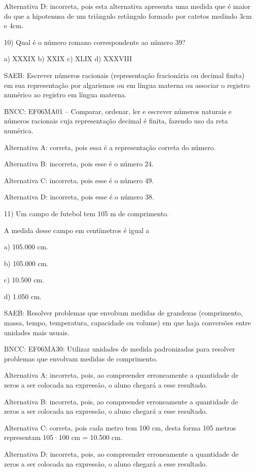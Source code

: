 Alternativa D: incorreta, pois esta alternativa apresenta uma medida que
é maior do que a hipotenusa de um triângulo retângulo formado por
catetos medindo 3cm e 4cm.

10) Qual é o número romano correspondente ao número 39?

a) XXXIX b) XXIX c) XLIX d) XXXVIII

SAEB: Escrever números racionais (representação fracionária ou decimal
finita) em sua representação por algarismos ou em língua materna ou
associar o registro numérico ao registro em língua materna.

BNCC: EF06MA01 -- Comparar, ordenar, ler e escrever números naturais e
números racionais cuja representação decimal é finita, fazendo uso da
reta numérica.

Alternativa A: correta, pois essa é a representação correta do número.

Alternativa B: incorreta, pois esse é o número 24.

Alternativa C: incorreta, pois esse é o número 49.

Alternativa D: incorreta, pois esse é o número 38.

11) Um campo de futebol tem 105 m de comprimento.

A medida desse campo em centímetros é igual a

a) 105.000 cm.

b) 105.000 cm.

c) 10.500 cm.

d) 1.050 cm.

SAEB: Resolver problemas que envolvam medidas de grandezas (comprimento,
massa, tempo, temperatura, capacidade ou volume) em que haja conversões
entre unidades mais usuais.

BNCC: EF06MA30: Utilizar unidades de medida padronizadas para resolver
problemas que envolvam medidas de comprimento.

Alternativa A: incorreta, pois, ao compreender erroneamente a quantidade
de zeros a ser colocada na expressão, o aluno chegará a esse resultado.

Alternativa B: incorreta, pois, ao compreender erroneamente a quantidade
de zeros a ser colocada na expressão, o aluno chegará a esse resultado.

Alternativa C: correta, pois cada metro tem 100 cm, desta forma 105
metros representam 105·100 cm = 10.500 cm.

Alternativa D: incorreta, pois, ao compreender erroneamente a quantidade
de zeros a ser colocada na expressão, o aluno chegará a esse resultado.

